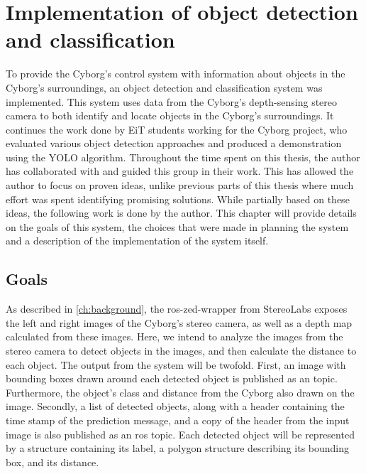 \documentclass[\rootfolder/main.tex]{subfiles}
\begin{document}
\chapter{Implementation of object detection and classification} %
\label{ch:implementation-objdet} %

To provide the Cyborg's control system with information about objects in the Cyborg's surroundings, an object detection and classification system was implemented.
This system uses data from the Cyborg's depth-sensing stereo camera to both identify and locate objects in the Cyborg's surroundings.
It continues the work done by EiT students working for the Cyborg project, who evaluated various object detection approaches and produced a demonstration using the YOLO algorithm.
Throughout the time spent on this thesis, the author has collaborated with and guided this group in their work.
This has allowed the author to focus on proven ideas, unlike previous parts of this thesis where much effort was spent identifying promising solutions.
While partially based on these ideas, the following work is done by the author.
This chapter will provide details on the goals of this system, the choices that were made in planning the system and a description of the implementation of the system itself.


\section{Goals}

As described in \cref{ch:background}, the ros-zed-wrapper from StereoLabs exposes the left and right images of the Cyborg's stereo camera, as well as a depth map calculated from these images.
Here, we intend to analyze the images from the stereo camera to detect objects in the images, and then calculate the distance to each object.
The output from the system will be twofold.
First, an image with bounding boxes drawn around each detected object is published as an  topic.
Furthermore, the object's class and distance from the Cyborg also drawn on the image.
Secondly, a list of detected objects, along with a header containing the time stamp of the prediction message, and a copy of the header from the input image is also published as an \acrshort{ros} topic.
Each detected object will be represented by a structure containing its label, a polygon structure describing its bounding box, and its distance.
\end{document}
